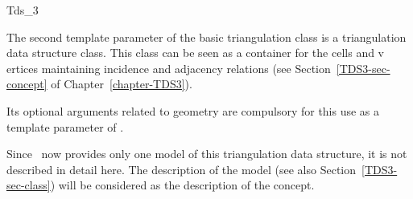 

\begin{ccRefConcept}{Tds_3}


\ccDefinition
  
The second template parameter of the basic triangulation class
 is a triangulation 
data structure class.  This class can be seen as a container for the
cells and v ertices maintaining incidence and adjacency relations (see 
Section~\ref{TDS3-sec-concept} of Chapter~\ref{chapter-TDS3}). 

Its optional arguments related to geometry are compulsory for this use as a
template parameter of .

Since \cgal\ now provides only one model of this triangulation data
structure, it is not described in detail here. The description of the
model  (see also
Section~\ref{TDS3-sec-class}) will be considered as the description of
the concept.

\ccHasModels


\ccSeeAlso



\end{ccRefConcept}



